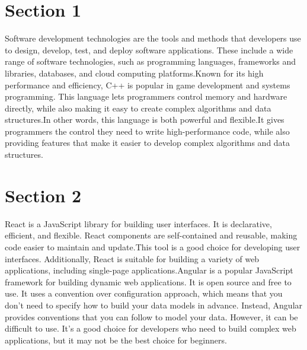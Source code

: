 \documentclass[fontsize12,a4]{article}
\begin{document}
\section*{Section 1}

Software development technologies are the tools and methods that developers use to design, develop, test, and deploy software applications. These include a wide range of software technologies, such as programming languages, frameworks and libraries, databases, and cloud computing platforms.Known for its high performance and efficiency, C++ is popular in game development and systems programming.
This language lets programmers control memory and hardware directly, while also making it easy to create complex algorithms and data structures.In other words, this language is both powerful and flexible.It gives programmers the control they need to write high-performance code, while also providing features that make it easier to develop complex algorithms and data structures.
\section*{Section 2}
React is a JavaScript library for building user interfaces. It is declarative, efficient, and flexible. React components are self-contained and reusable, making code easier to maintain and update.This tool is a good choice for developing user interfaces. Additionally, React is suitable for building a variety of web applications, including single-page applications.Angular is a popular JavaScript framework for building dynamic web applications. It is open source and free to use.
It uses a convention over configuration approach, which means that you don’t need to specify how to build your data models in advance. Instead, Angular provides conventions that you can follow to model your data. However, it can be difficult to use. It’s a good choice for developers who need to build complex web applications, but it may not be the best choice for beginners.
\end{document}
